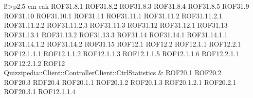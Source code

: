 \begin{tabella}{l!{\VRule}>{\centering\arraybackslash}p{2.5 cm}}
eak ROF31.8.1 \linebreak ROF31.8.2 \linebreak ROF31.8.3 \linebreak ROF31.8.4 \linebreak ROF31.8.5 \linebreak ROF31.9 \linebreak ROF31.10 \linebreak ROF31.10.1 \linebreak ROF31.11 \linebreak ROF31.11.1 \linebreak ROF31.11.2 \linebreak ROF31.11.2.1 \linebreak ROF31.11.2.2 \linebreak ROF31.11.2.3 \linebreak ROF31.11.3 \linebreak ROF31.12 \linebreak ROF31.12.1 \linebreak ROF31.13 \linebreak ROF31.13.1 \linebreak ROF31.13.2 \linebreak ROF31.13.3 \linebreak ROF31.14 \linebreak ROF31.14.1 \linebreak ROF31.14.1.1 \linebreak ROF31.14.1.2 \linebreak ROF31.14.2 \linebreak ROF31.15 \linebreak ROF12.1 \linebreak ROF12.2 \linebreak ROF12.1.1 \linebreak ROF12.2.1 \linebreak ROF12.1.1.1 \linebreak ROF12.1.1.2 \linebreak ROF12.1.1.3 \linebreak ROF12.1.1.5 \linebreak ROF12.1.1.6 \linebreak ROF12.2.1.1 \linebreak ROF12.2.1.2 \linebreak ROF12 \\
Quizzipedia::Client::ControllerClient::CtrlStatistics & ROF20.1 \linebreak ROF20.2 \linebreak ROF20.3 \linebreak RDF20.4 \linebreak ROF20.1.1 \linebreak ROF20.1.2 \linebreak ROF20.1.3 \linebreak ROF20.1.2.1 \linebreak ROF20.2.1 \linebreak ROF20.3.1 \linebreak ROF12.1.1.4 \\

\end{tabella}
